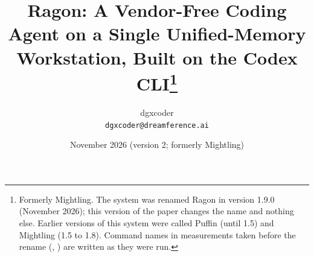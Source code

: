 

\title{Ragon: A Vendor-Free Coding Agent on a Single Unified-Memory Workstation, Built on
the Codex CLI\thanks{Formerly Mightling. The system was renamed Ragon in version 1.9.0 (November 2026);
this version of the paper changes the name and nothing else. Earlier versions of this system were
called Puffin (until 1.5) and Mightling (1.5 to 1.8). Command names in measurements taken before the
rename (, ) are written as they were run.}}

\author{dgxcoder\\ \texttt{dgxcoder@dreamference.ai}}

\date{November 2026 (version 2; formerly Mightling)}
